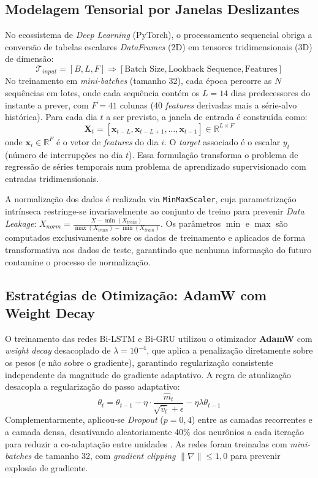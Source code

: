 \subsection{Modelagem Tensorial por Janelas Deslizantes}
No ecossistema de \textit{Deep Learning} (PyTorch), o processamento sequencial obriga a conversão de tabelas escalares \textit{DataFrames} (2D) em tensores tridimensionais (3D) de dimensão:
\begin{equation}
    \mathcal{T}_{input} = [B, L, F] \Rightarrow [\text{Batch Size}, \text{Lookback Sequence}, \text{Features}]
\end{equation}
No treinamento em \textit{mini-batches} (tamanho 32), cada época percorre as $N$ sequências em lotes, onde cada sequência contém os $L = 14$ dias predecessores do instante a prever, com $F = 41$ colunas (40 \textit{features} derivadas mais a série-alvo histórica). Para cada dia $t$ a ser previsto, a janela de entrada é construída como:
\begin{equation}
    \mathbf{X}_t = [\mathbf{x}_{t-L}, \mathbf{x}_{t-L+1}, \dots, \mathbf{x}_{t-1}] \in \mathbb{R}^{L \times F}
\end{equation}
onde $\mathbf{x}_i \in \mathbb{R}^F$ é o vetor de \textit{features} do dia $i$. O \textit{target} associado é o escalar $y_t$ (número de interrupções no dia $t$). Essa formulação transforma o problema de regressão de séries temporais num problema de aprendizado supervisionado com entradas tridimensionais.

A normalização dos dados é realizada via \texttt{MinMaxScaler}, cuja parametrização intrínseca restringe-se invariavelmente ao conjunto de treino para prevenir \textit{Data Leakage}: $X_{norm} = \frac{X - \min(X_{train})}{\max(X_{train}) - \min(X_{train})}$. Os parâmetros $\min$ e $\max$ são computados exclusivamente sobre os dados de treinamento e aplicados de forma transformativa aos dados de teste, garantindo que nenhuma informação do futuro contamine o processo de normalização.

\subsection{Estratégias de Otimização: AdamW com Weight Decay}
O treinamento das redes Bi-LSTM e Bi-GRU utilizou o otimizador \textbf{AdamW} \cite{loshchilov2019decoupled} com \textit{weight decay} desacoplado de $\lambda = 10^{-4}$, que aplica a penalização diretamente sobre os pesos (e não sobre o gradiente), garantindo regularização consistente independente da magnitude do gradiente adaptativo. A regra de atualização desacopla a regularização do passo adaptativo:
\begin{equation}
    \theta_t = \theta_{t-1} - \eta \cdot \frac{\hat{m}_t}{\sqrt{\hat{v}_t} + \epsilon} - \eta \lambda \theta_{t-1}
\end{equation}
Complementarmente, aplicou-se \textit{Dropout} ($p = 0{,}4$) entre as camadas recorrentes e a camada densa, desativando aleatoriamente 40\% dos neurônios a cada iteração para reduzir a co-adaptação entre unidades \cite{goodfellow2016deep}. As redes foram treinadas com \textit{mini-batches} de tamanho 32, com \textit{gradient clipping} $\|\nabla\| \leq 1{,}0$ para prevenir explosão de gradiente.

